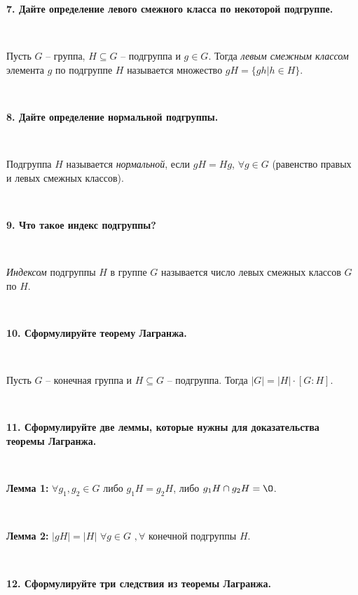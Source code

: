 \documentclass{article}
\begin{document}
	\textbf{7. Дайте определение левого смежного класса по некоторой подгруппе.}
	
	{
		$\;$
		\setlength{\parindent}{0.4cm}
		\hangindent=0.4cm
		
		Пусть $G$ -- группа, $H\subseteq G$ --  подгруппа и $g\in G$. Тогда \textit{левым смежным классом} элемента $g$ по подгруппе $H$ называется множество $gH=\{gh|h\in H \}$.
		
		$\;$
		\setlength{\parindent}{0cm}
		\hangindent=0cm
	}
	
	\textbf{8. Дайте определение нормальной подгруппы.}
	
	{
		$\;$
		\setlength{\parindent}{0.4cm}
		\hangindent=0.4cm
		
		Подгруппа $H$ называется \textit{нормальной}, если $gH=Hg$, $\forall g\in G$ (равенство правых и левых смежных классов).
		
		$\;$
		\setlength{\parindent}{0cm}
		\hangindent=0cm
	}
	
	\textbf{9. Что такое индекс подгруппы?}
	
	{
		$\;$
		\setlength{\parindent}{0.4cm}
		\hangindent=0.4cm
		
		\textit{Индексом} подгруппы $H$ в группе $G$ называется число левых смежных классов $G$ по $H$.
		
		$\;$
		\setlength{\parindent}{0cm}
		\hangindent=0cm
	}
	
	\textbf{10. Сформулируйте теорему Лагранжа.}
	
	{
		$\;$
		\setlength{\parindent}{0.4cm}
		\hangindent=0.4cm
		
		Пусть $G$ -- конечная группа и $H\subseteq G$ -- подгруппа. Тогда $|G|=|H|\cdot[G:H]$.
		
		$\;$
		\setlength{\parindent}{0cm}
		\hangindent=0cm
	}
	
	\textbf{11. Сформулируйте две леммы, которые нужны для доказательства теоремы Лагранжа.}
	
	{
		$\;$
		\setlength{\parindent}{0.4cm}
		\hangindent=0.4cm
		
		\textbf{Лемма 1:} $\forall g_1, g_2\in G$ либо $g_1H=g_2H$, либо $g_1H\cap g_2H=\O$.
		
		$\;$
		
		\textbf{Лемма 2:} $|gH|=|H|$ $\forall g\in G$ $, \forall$ конечной подгруппы $H$.
		
		$\;$
		\setlength{\parindent}{0cm}
		\hangindent=0cm
	}
	
	\textbf{12. Сформулируйте три следствия из теоремы Лагранжа.}
	
\end{document}

